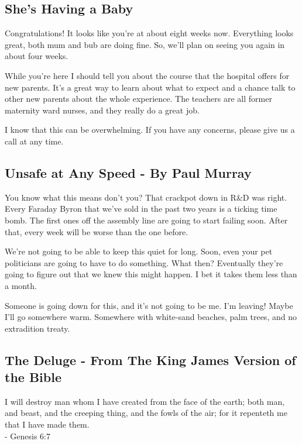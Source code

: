 \documentclass[12pt, a5paper, parskip=half-]{scrartcl}
\begin{document}
\subsection*{She's Having a Baby} \label{subsection:shes-having-a-baby}
Congratulations! It looks like you're at about eight weeks now.
Everything looks great, both mum and bub are doing fine. 
So, we'll plan on seeing you again in about four weeks.

While you're here I should tell you about the course that the hospital offers for new parents.
It's a great way to learn about what to expect and a chance talk to other new parents about the whole experience. 
The teachers are all former maternity ward nurses, and they really do a great job.

I know that this can be overwhelming.
If you have any concerns, please give us a call at any time. 

\newpage
\subsection*{Unsafe at Any Speed \setmainfont{URWClassico} - By Paul Murray} \label{subsection:unsafe-at-any-speed}
You know what this means don't you?
That crackpot down in R\&D was right. 
Every Faraday Byron that we've sold in the past two years is a ticking time bomb.
The first ones off the assembly line are going to start failing soon.
After that, every week will be worse than the one before.

We're not going to be able to keep this quiet for long.
Soon, even your pet politicians are going to have to do something.
What then?
Eventually they're going to figure out that we knew this might happen.
I bet it takes them less than a month.

Someone is going down for this, and it's not going to be me.
I'm leaving!
Maybe I'll go somewhere warm. 
Somewhere with white-sand beaches, palm trees,  and no extradition treaty.

\subsection*{The Deluge \setmainfont{URWClassico}- From The King James Version of the Bible} \label{subsection:the-deluge}
I will destroy man whom I have created from the face of the earth; both man, and beast, and the creeping thing, and the fowls of the air; for it repenteth me that I have made them.\\ 
\vspace{0.5ex}\hspace{8cm} - Genesis 6:7
\end{document}
